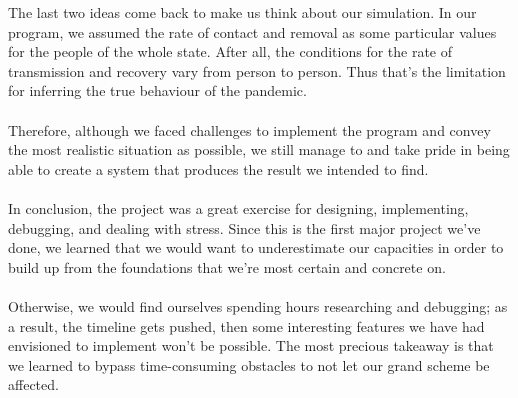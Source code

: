 \documentclass[12pt]{article}
\begin{document}
The last two ideas come back to make us think about our simulation. In our program, we assumed the rate of contact and removal as some particular values for the people of the whole state. After all, the conditions for the rate of transmission and recovery vary from person to person. Thus that's the limitation for inferring the true behaviour of the pandemic.\\\\
Therefore, although we faced challenges to implement the program and convey the most realistic situation as possible, we still manage to and take pride in being able to create a system that produces the result we intended to find.\\\\
In conclusion, the project was a great exercise for designing, implementing, debugging, and dealing with stress. Since this is the first major project we've done, we learned that we would want to underestimate our capacities in order to build up from the foundations that we're most certain and concrete on.\\\\
Otherwise, we would find ourselves spending hours researching and debugging; as a result, the timeline gets pushed, then some interesting features we have had envisioned to implement won't be possible. The most precious takeaway is that we learned to bypass time-consuming obstacles to not let our grand scheme be affected.

\newpage
\end{document}
